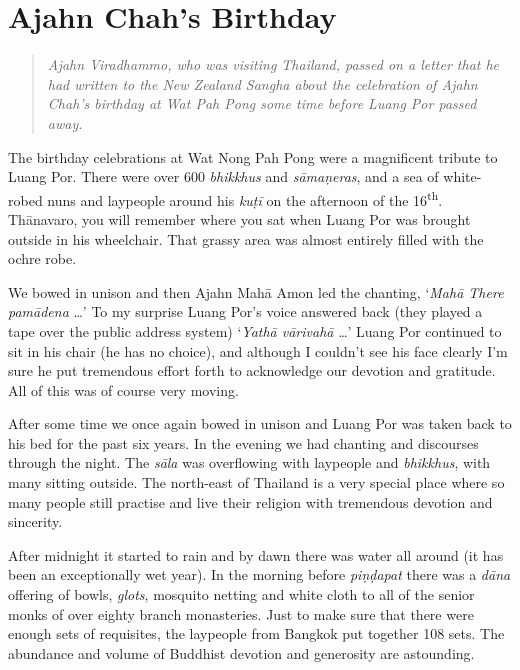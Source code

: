 
\chapter{Ajahn Chah's Birthday}

\begin{quote}\itshape
Ajahn Viradhammo, who was visiting Thailand, passed on a
letter that he had written to the New Zealand Sangha about the
celebration of Ajahn Chah's birthday at Wat Pah Pong some time before
Luang Por passed away.
\end{quote}

\noindent
The birthday celebrations at Wat Nong Pah Pong were a magnificent
tribute to Luang Por. There were over 600 \emph{bhikkhus} and
\emph{sāmaṇeras}, and a sea of white-robed nuns and laypeople around his
\emph{kuṭī} on the afternoon of the 16\textsuperscript{th}. Thānavaro,
you will remember where you sat when Luang Por was brought outside in
his wheelchair. That grassy area was almost entirely filled with the
ochre robe.

We bowed in unison and then Ajahn Mahā Amon led the chanting, `\emph{Mahā There
pamādena} \ldots{}' To my surprise Luang Por's voice answered back (they played
a tape over the public address system) `\emph{Yathā vārivahā} \ldots{}' Luang
Por continued to sit in his chair (he has no choice), and although I couldn't
see his face clearly I'm sure he put tremendous effort forth to acknowledge our
devotion and gratitude. All of this was of course very moving.

After some time we once again bowed in unison and Luang Por was taken
back to his bed for the past six years. In the evening we had chanting
and discourses through the night. The \emph{sāla} was overflowing with
laypeople and \emph{bhikkhus}, with many sitting outside. The
north-east of Thailand is a very special place where so many people
still practise and live their religion with tremendous devotion and
sincerity.

After midnight it started to rain and by dawn there was water all around
 (it has been an exceptionally wet year). In the morning before
\emph{piṇḍapat} there was a \emph{dāna} offering of bowls, \emph{glots},
mosquito netting and white cloth to all of the senior monks of over
eighty branch monasteries. Just to make sure that there were enough sets
of requisites, the laypeople from Bangkok put together 108 sets. The
abundance and volume of Buddhist devotion and generosity are astounding.

